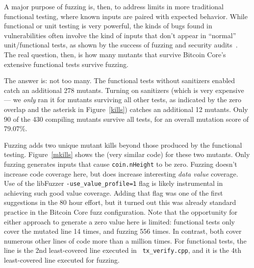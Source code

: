 A major purpose of fuzzing is, then, to address limits in more
traditional functional testing, where known inputs are paired with
expected behavior.  While functional or unit testing is very powerful,
the kinds of bugs found in vulnerabilities often involve the kind of
inputs that don't appear in ``normal'' unit/functional tests, as shown
by the success of fuzzing and security audits~\cite{FC20}.  The real
question, then, is how many mutants that survive Bitcoin Core's
extensive functional tests survive fuzzing.

The answer is: not too many.  The functional tests without sanitizers
enabled catch an additional 278 mutants.  Turning on sanitizers (which
is very expensive --- we \emph{only} ran it for mutants surviving all other
tests, as indicated by the zero overlap and the asterisk in Figure~\ref{kills}) catches an additional 12 mutants.  Only 90 of the
430 compiling mutants survive all tests, for an overall mutation score
of 79.07\%.

Fuzzing adds two unique mutant kills beyond those produced by
the functional testing.  Figure~\ref{mkills} shows the (very similar
code) for these two mutants.  Only fuzzing generates inputs that cause
{\tt coin.nHeight} to be zero.  Fuzzing doesn't increase code coverage
here, but does increase interesting \emph{data value} coverage.  Use
of the libFuzzer {\tt -use\_value\_profile=1} flag is likely
instrumental in achieving such good value coverage.  Adding that flag was
one of the first suggestions in the 80 hour effort, but it turned out
this was already standard practice in the Bitcoin Core fuzz
configuration.  Note that the opportunity for either approach to
generate a zero value here is limited: functional tests only cover the
mutated line 14 times, and fuzzing 556 times.  In contrast, both cover
numerous other lines of code more than a million times.  For
functional tests, the line is the 2nd least-covered line executed in {\tt
  tx\_verify.cpp}, and it is the 4th least-covered line executed for fuzzing.

